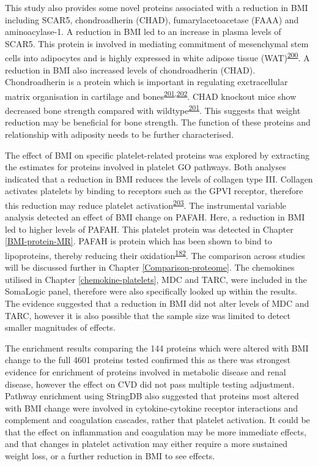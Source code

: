 \documentclass[11pt,twoside]{bristolthesis}
\begin{document}
This study also provides some novel proteins associated with a reduction in BMI including SCAR5, chondroadherin (CHAD), fumarylacetoacetase (FAAA) and aminoacylase-1. A reduction in BMI led to an increase in plasma levels of SCAR5. This protein is involved in mediating commitment of mesenchymal stem cells into adipocytes and is highly expressed in white adipose tissue (WAT)\textsuperscript{\protect\hyperlink{ref-Lee2017a}{200}}. A reduction in BMI also increased levels of chondroadherin (CHAD). Chondroadherin is a protein which is important in regulating exctracellular matrix organisation in cartilage and bones\textsuperscript{\protect\hyperlink{ref-Hessle2013}{201},\protect\hyperlink{ref-Iozzo2015}{202}}. CHAD knockout mice show decreased bone strength compared with wildtype\textsuperscript{\protect\hyperlink{ref-Hessle2013}{201}}. This suggests that weight reduction may be beneficial for bone strength. The function of these proteins and relationship with adiposity needs to be further characterised.

The effect of BMI on specific platelet-related proteins was explored by extracting the estimates for proteins involved in platelet GO pathways. Both analyses indicated that a reduction in BMI reduces the levels of collagen type III. Collagen activates platelets by binding to receptors such as the GPVI receptor, therefore this reduction may reduce platelet activation\textsuperscript{\protect\hyperlink{ref-Maurice2006}{203}}. The instrumental variable analysis detected an effect of BMI change on PAFAH. Here, a reduction in BMI led to higher levels of PAFAH. This platelet protein was detected in Chapter \ref{BMI-protein-MR}. PAFAH is protein which has been shown to bind to lipoproteins, thereby reducing their oxidation\textsuperscript{\protect\hyperlink{ref-Noto2003}{182}}. The comparison across studies will be discussed further in Chapter \ref{Comparison-proteome}. The chemokines utilised in Chapter \ref{chemokine-platelets}, MDC and TARC, were included in the SomaLogic panel, therefore were also specifically looked up within the results. The evidence suggested that a reduction in BMI did not alter levels of MDC and TARC, however it is also possible that the sample size was limited to detect smaller magnitudes of effects.

The enrichment results comparing the 144 proteins which were altered with BMI change to the full 4601 proteins tested confirmed this as there was strongest evidence for enrichment of proteins involved in metabolic disease and renal disease, however the effect on CVD did not pass multiple testing adjustment. Pathway enrichment using StringDB also suggested that proteins most altered with BMI change were involved in cytokine-cytokine receptor interactions and complement and coagulation cascades, rather that platelet activation. It could be that the effect on inflammation and coagulation may be more immediate effects, and that changes in platelet activation may either require a more sustained weight loss, or a further reduction in BMI to see effects.
\end{document}
